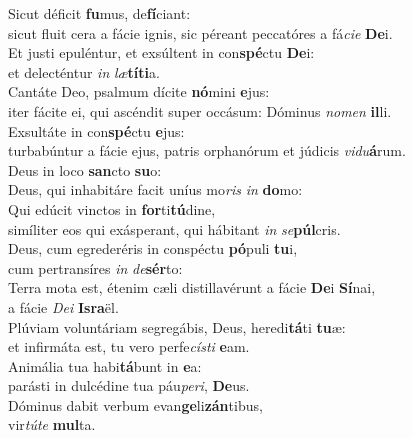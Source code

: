 \evenverse Sicut déficit \textbf{fu}mus, de\textbf{fí}ciant:~\*\\
\evenverse sicut fluit cera a fácie ignis, sic péreant peccatóres a fá\textit{ci}\textit{e} \textbf{De}i.\\
\oddverse Et justi epuléntur, et exsúltent in con\textbf{spé}ctu \textbf{De}i:~\*\\
\oddverse et delecténtur \textit{in} \textit{læ}\textbf{tí}\textbf{ti}a.\\
\evenverse Cantáte Deo, psalmum dícite \textbf{nó}mini \textbf{e}jus:~\*\\
\evenverse iter fácite ei, qui ascéndit super occásum: Dóminus \textit{no}\textit{men} \textbf{il}li.\\
\oddverse Exsultáte in con\textbf{spé}ctu \textbf{e}jus:~\*\\
\oddverse turbabúntur a fácie ejus, patris orphanórum et júdicis \textit{vi}\textit{du}\textbf{á}rum.\\
\evenverse Deus in loco \textbf{san}cto \textbf{su}o:~\*\\
\evenverse Deus, qui inhabitáre facit uníus mo\textit{ris} \textit{in} \textbf{do}mo:\\
\oddverse Qui edúcit vinctos in \textbf{for}ti\textbf{tú}dine,~\*\\
\oddverse simíliter eos qui exásperant, qui hábitant \textit{in} \textit{se}\textbf{púl}cris.\\
\evenverse Deus, cum egrederéris in conspéctu \textbf{pó}puli \textbf{tu}i,~\*\\
\evenverse cum pertransíres \textit{in} \textit{de}\textbf{sér}to:\\
\oddverse Terra mota est, étenim cæli distillavérunt a fácie \textbf{De}i \textbf{Sí}nai,~\*\\
\oddverse a fácie \textit{De}\textit{i} \textbf{Is}\textbf{ra}ël.\\
\evenverse Plúviam voluntáriam segregábis, Deus, heredi\textbf{tá}ti \textbf{tu}æ:~\*\\
\evenverse et infirmáta est, tu vero perfe\textit{cí}\textit{sti} \textbf{e}am.\\
\oddverse Animália tua habi\textbf{tá}bunt in \textbf{e}a:~\*\\
\oddverse parásti in dulcédine tua páu\textit{pe}\textit{ri}, \textbf{De}us.\\
\evenverse Dóminus dabit verbum evan\textbf{ge}li\textbf{zán}tibus,~\*\\
\evenverse vir\textit{tú}\textit{te} \textbf{mul}ta.\\
